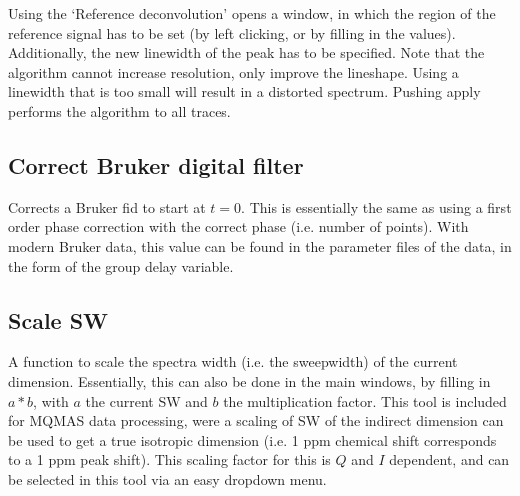 \documentclass[11pt,a4paper]{article}
\begin{document}
Using the `Reference deconvolution' opens a window, in which the region of the reference signal has to be set (by left clicking, or by filling in the values). Additionally, the new linewidth of the peak has to be specified. Note that the algorithm cannot increase resolution, only improve the lineshape. Using a linewidth that is too small will result in a distorted spectrum. Pushing apply performs the algorithm to all traces.

\subsection{Correct Bruker digital filter}
Corrects a Bruker fid to start at $t=0$. This is essentially the same as using a first order phase
correction with the correct phase (i.e. number of points). With modern Bruker data, this value can
be found in the parameter files of the data, in the form of the group delay variable.

\subsection{Scale SW}
A function to scale the spectra width (i.e. the sweepwidth) of the current dimension. Essentially,
this can also be done in the main windows, by filling in $a * b$, with $a$ the current SW and $b$
the multiplication factor. This tool is included for MQMAS data processing, were a scaling of SW of the
indirect dimension can be used to get a true isotropic dimension (i.e. 1 ppm chemical shift
corresponds to a 1 ppm peak shift). This scaling factor for this is $Q$ and $I$ dependent, and can be selected in
this tool via an easy dropdown menu.

\end{document}
